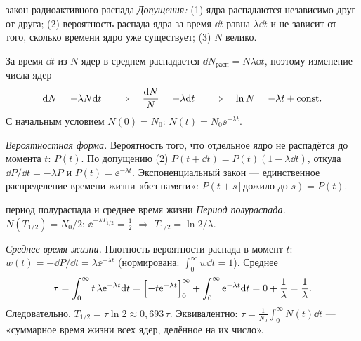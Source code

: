 \begin{derivation}[label=der:18:law]{закон радиоактивного распада}
\emph{Допущения:} (1) ядра распадаются независимо друг от друга; (2) вероятность распада ядра за время $\dd t$ равна $\lambda\dd t$ и не
зависит от того, сколько времени ядро уже существует; (3) $N$ велико.

За время $\dd t$ из $N$ ядер в среднем распадается $\dd N_{\text{расп}}=N\lambda\dd t$, поэтому изменение числа ядер
\[
  \mathrm{d} N=-\lambda N\mathrm{d} t\quad\Longrightarrow\quad\frac{\mathrm{d} N}{N}=-\lambda\mathrm{d} t\quad\Longrightarrow\quad\ln N=-\lambda t+\mathrm{const} .
\]
С начальным условием $N(0)=N_0$: $N(t)=N_0\ee^{-\lambda t}$.

\emph{Вероятностная форма.} Вероятность того, что отдельное ядро не распадётся до момента $t$: $P(t)$. По допущению (2)
$P(t+\dd t)=P(t)(1-\lambda\dd t)$, откуда $\dd P/\dd t=-\lambda P$ и $P(t)=\ee^{-\lambda t}$. Экспоненциальный закон — единственное
распределение времени жизни «без памяти»: $P(t+s\,|\,\text{дожило до }s)=P(t)$.
\end{derivation}

\begin{derivation}[label=der:18:tau]{период полураспада и среднее время жизни}
\emph{Период полураспада.} $N(T_{1/2})=N_0/2$: $\ee^{-\lambda T_{1/2}}=\frac12$ $\Rightarrow$ $T_{1/2}=\ln2/\lambda$.

\emph{Среднее время жизни.} Плотность вероятности распада в момент $t$: $w(t)=-\dd P/\dd t=\lambda\ee^{-\lambda t}$ (нормирована:
$\int_0^\infty w\dd t=1$). Среднее
\[
  \tau=\int_0^\infty t\,\lambda\mathrm{e}^{-\lambda t}\mathrm{d} t=\Bigl[-t\mathrm{e}^{-\lambda t}\Bigr]_0^\infty+\int_0^\infty\mathrm{e}^{-\lambda t}\mathrm{d} t=0+\frac1\lambda=\frac1\lambda .
\]
Следовательно, $T_{1/2}=\tau\ln2\approx0{,}693\,\tau$. Эквивалентно: $\tau=\frac{1}{N_0}\int_0^\infty N(t)\dd t$ — «суммарное время жизни всех ядер,
делённое на их число».
\end{derivation}

